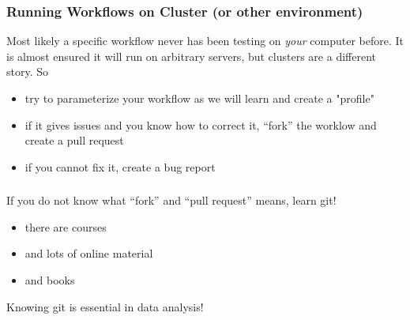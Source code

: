 %


\begin{frame}[fragile]
  \frametitle{Running Workflows on Cluster (or other environment)}
  Most likely a specific workflow never has been testing on \emph{your} computer before. It is almost ensured it will run on arbitrary servers, but clusters are a different story. \newline
  So
  \begin{itemize}[<+->]
   \item try to parameterize your workflow as we will learn and create a "profile"
   \item if it gives issues and you know how to correct it, ``fork'' the worklow and create a pull request
   \item if you cannot fix it, create a bug report
  \end{itemize}
\end{frame}

\begin{frame}
  \frametitle{}
  If you do not know what ``fork'' and ``pull request'' means, learn git!
  \begin{itemize}[<+->]
   \item there are courses
   \item and lots of online material
   \item and books
  \end{itemize}
  \pause
  \begin{warning}
  	Knowing git is essential in data analysis!
  \end{warning}
\end{frame}

